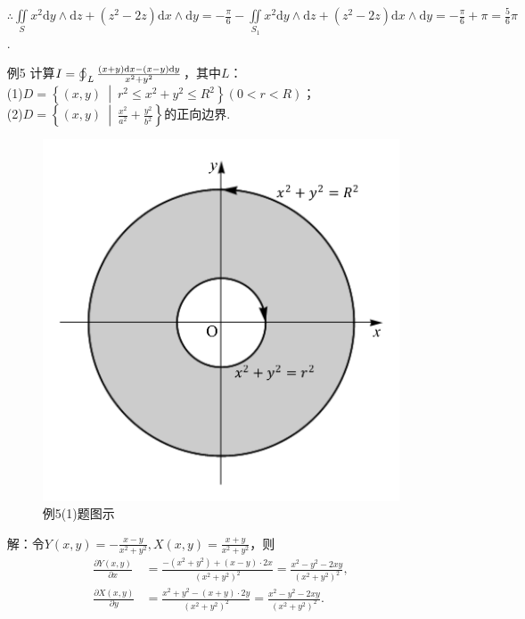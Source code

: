 \documentclass[12pt,UTF8,fleqn]{ctexart}
\newcommand\Set[2]{\left\{#1\ \middle\vert\ #2 \right\}}
\newcommand{\BLOInt}[2]{\varoint\nolimits_{#1}#2}
\newcommand{\md}[1]{\mathrm d#1}
\newcommand{\BSIInt}[2]{\iint\limits_{#1}#2}
\begin{document}
\begin{enumerate}
$\therefore\BSIInt S{x^2\md y\wedge\md z+(z^2-2z)\md x\wedge\md y}=-\frac\pi6-\BSIInt{S_1}{x^2\md y\wedge\md z+(z^2-2z)\md x\wedge\md y}=-\frac\pi6+\pi=\frac56\pi$.
\item[例5]计算$I=\BLOInt L{\frac{(x+y)\mathrm dx-(x-y)\mathrm dy}{x^2+y^2}}$，其中$L$：\\
(1)$D=\Set{(x,y)}{r^2\leqslant x^2+y^2\leqslant R^2}(0<r<R)$；\\
(2)$D=\Set{(x,y)}{\frac{x^2}{a^2}+\frac{y^2}{b^2}}$的正向边界.

\begin{figure}[H]
\begin{center}
\includegraphics[height=0.3\textheight]{Figures20190613/Fig13-3-2-1.pdf}
\end{center}
\caption{例5(1)题图示}
\label{13-3-2-1}
\end{figure}


解：令$Y(x,y)=-\frac{x-y}{x^2+y^2},X(x,y)=\frac{x+y}{x^2+y^2}$，则\[\begin{split}
\frac{\partial Y(x,y)}{\partial x}&=\frac{-(x^2+y^2)+(x-y)\cdot2x}{(x^2+y^2)^2}=\frac{x^2-y^2-2xy}{(x^2+y^2)^2},\\
\frac{\partial X(x,y)}{\partial y}&=\frac{x^2+y^2-(x+y)\cdot2y}{(x^2+y^2)^2}=\frac{x^2-y^2-2xy}{(x^2+y^2)^2}.
\end{split}\]


\end{enumerate}
\end{document}
